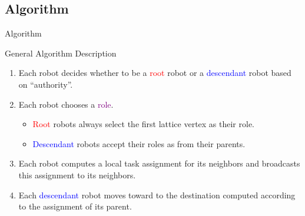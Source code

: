\documentclass[10pt]{beamer}
\begin{document}
\subsection{Algorithm}
\begin{frame}{Algorithm}
  \begin{block}{General Algorithm Description}
    \begin{enumerate}
    \item<1-> Each robot decides whether to be a \textcolor{red}{root}
      robot or a \textcolor{blue}{descendant} robot based on ``authority''.
      
    \item<2-> Each robot chooses a \textcolor{purple}{role}. 
      \begin{itemize}
      \item \textcolor{red}{Root} robots always select the
        first lattice vertex as their role.  
      \item \textcolor{blue}{Descendant} robots accept
        their roles as from their parents.
      \end{itemize}    
      
    \item<3-> Each robot computes a local task assignment for
      its neighbors and broadcasts this assignment to its neighbors.
      
    \item<4-> Each \textcolor{blue}{descendant} robot moves toward to
      the destination computed according to the assignment of its parent.
    \end{enumerate}
  \end{block}
\end{frame}
\end{document}
